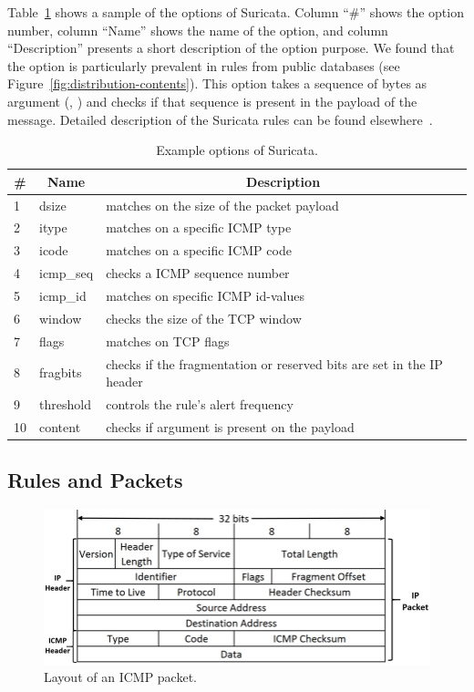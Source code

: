 \documentclass[runningheads]{llncs}
\begin{document}
Table~\ref{table:rules} shows a sample of the options of
Suricata. Column ``\#'' shows the option number, column ``Name'' shows
the name of the option, and column
``Description'' presents a short description of the option purpose. We
found that the option  is particularly prevalent in
rules from public databases (see
Figure~\ref{fig:distribution-contents}). This option takes a sequence
of bytes as argument (\eg{}, ) and checks
if that sequence is present in the payload of the message. Detailed
description of the Suricata rules can be found
elsewhere~\cite{suri-rule-format}.

\begin{table}[t!]
  \caption{\label{table:rules}Example options of Suricata.}  
  \centering
  \begin{tabular}{p{0.35cm}ll}
    \toprule
    \multicolumn{1}{c}{\#} & \multicolumn{1}{c}{Name} &  \multicolumn{1}{c}{Description}\\
    \midrule     
    1 & dsize & matches on the size of the packet payload\\
    2 & itype &  matches on a specific ICMP type\\
    3 & icode & matches on a specific ICMP code\\
    4 & icmp\_seq  & checks a ICMP sequence number\\
    5 & icmp\_id & matches on specific ICMP id-values\\
    6 & window & checks the size of the TCP window\\
    7 & flags & matches on TCP flags\\
    8 & fragbits & checks if the fragmentation or reserved bits are set in the IP header\\
    9 & threshold & controls the rule’s alert frequency\\
    10 & content & checks if argument is present on the payload\\
    \bottomrule
  \end{tabular}
\end{table}

\subsection{Rules and Packets}
\label{sec:rules-and-packets}

\begin{figure}[h!]
\centering
\includegraphics[scale=0.3]{figs/ICMP-packet-structure.png}
\caption{Layout of an ICMP packet.}
\label{fig:icmp-packet-layout}
\end{figure}
\end{document}
